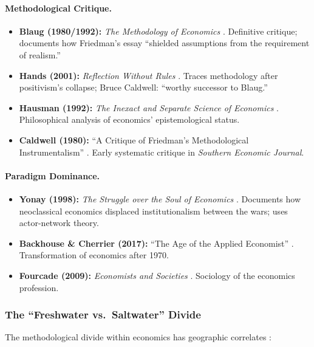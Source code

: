 \paragraph{Methodological Critique.}
\begin{itemize}[nosep]
    \item \textbf{Blaug (1980/1992):} \textit{The Methodology of Economics}
        \citep{blaug1992}. Definitive critique; documents how Friedman's essay
        ``shielded assumptions from the requirement of realism.''
    \item \textbf{Hands (2001):} \textit{Reflection Without Rules} \citep{hands2001}.
        Traces methodology after positivism's collapse; Bruce Caldwell: ``worthy
        successor to Blaug.''
    \item \textbf{Hausman (1992):} \textit{The Inexact and Separate Science of Economics}
        \citep{hausman1992}. Philosophical analysis of economics' epistemological status.
    \item \textbf{Caldwell (1980):} ``A Critique of Friedman's Methodological
        Instrumentalism'' \citep{caldwell1980}. Early systematic critique in
        \textit{Southern Economic Journal}.
\end{itemize}

\paragraph{Paradigm Dominance.}
\begin{itemize}[nosep]
    \item \textbf{Yonay (1998):} \textit{The Struggle over the Soul of Economics}
        \citep{yonay1998}. Documents how neoclassical economics displaced institutionalism
        between the wars; uses actor-network theory.
    \item \textbf{Backhouse \& Cherrier (2017):} ``The Age of the Applied Economist''
        \citep{backhouse2017}. Transformation of economics after 1970.
    \item \textbf{Fourcade (2009):} \textit{Economists and Societies} \citep{fourcade2009}.
        Sociology of the economics profession.
\end{itemize}

\subsubsection{The ``Freshwater vs.\ Saltwater'' Divide}

The methodological divide within economics has geographic correlates
\citep{hall1976}:

